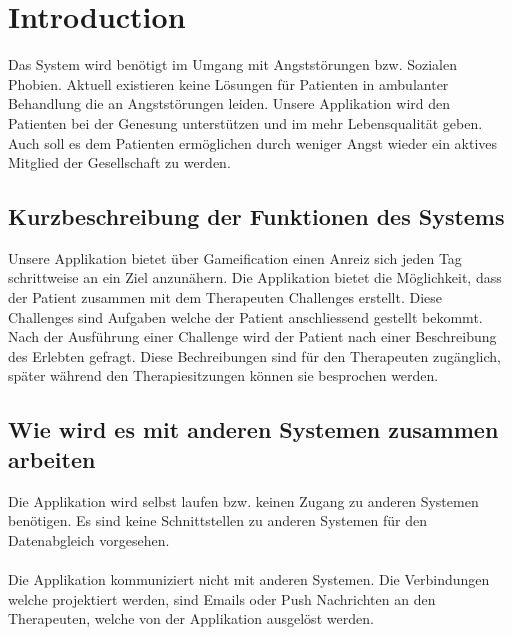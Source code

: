 \chapter{Introduction}

Das System wird benötigt im Umgang mit Angststörungen bzw. Sozialen Phobien. Aktuell existieren keine Lösungen für Patienten in ambulanter Behandlung die an Angststörungen leiden. Unsere Applikation wird den Patienten bei der Genesung unterstützen und im mehr Lebensqualität geben. Auch soll es dem Patienten ermöglichen durch weniger Angst wieder ein aktives Mitglied der Gesellschaft zu werden.

\section{Kurzbeschreibung der Funktionen des Systems}

Unsere Applikation bietet über \gls{Gameification} einen Anreiz sich jeden Tag schrittweise an ein Ziel anzunähern. Die Applikation bietet die Möglichkeit, dass der Patient zusammen mit dem Therapeuten \gls{Challenges} erstellt. Diese \gls{Challenges} sind Aufgaben welche der Patient anschliessend gestellt bekommt. Nach der Ausführung einer Challenge wird der Patient nach einer Beschreibung des Erlebten gefragt. Diese Bechreibungen sind für den Therapeuten zugänglich, später während den Therapiesitzungen können sie besprochen werden.

\section{Wie wird es mit anderen Systemen zusammen arbeiten}

Die Applikation wird selbst laufen bzw. keinen Zugang zu anderen Systemen benötigen. Es sind keine Schnittstellen zu anderen Systemen für den Datenabgleich vorgesehen. \\ \\
Die Applikation kommuniziert nicht mit anderen Systemen. Die Verbindungen welche projektiert werden, sind Emails oder Push Nachrichten an den Therapeuten, welche von der Applikation ausgelöst werden.
